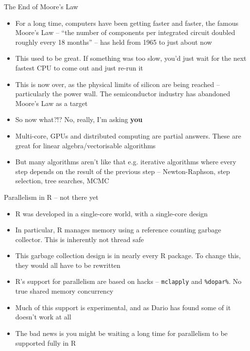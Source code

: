 \documentclass{beamer}
\begin{document}
\begin{frame}{The End of Moore's Law}
\begin{itemize}
\item For a long time, computers have been getting faster and faster, the famous
			Moore's Law -- ``the number of components per integrated circuit doubled roughly every 18 months'' -- 
			has held from 1965 to just about now
\item This used to be great. If something was too slow, you'd just wait for the next fastest CPU to come out
			and just re-run it
\item This is now over, as the physical limits of silicon are being reached -- particularly the power wall. 
			The semiconductor industry has abandoned Moore's Law as a target
\item So now what?!? No, really, I'm asking \textbf{you}
\item Multi-core, GPUs and distributed computing are partial answers. These are great for
			linear algebra/vectorisable algorithms
\item But many algorithms aren't like that e.g. iterative algorithms where every step depends on the 
			result of the previous step -- Newton-Raphson, step selection, tree searches, MCMC
\end{itemize}
\end{frame}

\begin{frame}{Parallelism in R -- not there yet}
\begin{itemize}
\item R was developed in a single-core world, with a single-core design
\item In particular, R manages memory using a reference counting garbage collector. This is inherently
			not thread safe
\item This garbage collection design is in nearly every R package. To change this, they would all have to
			be rewritten
\item R's support for parallelism are based on hacks -- \texttt{mclapply} and \texttt{\%dopar\%}. No true 
			shared memory concurrency
\item Much of this	support is experimental, and as Dario has found some of it doesn't work at all
\item The bad news is you might be waiting a long time for parallelism to be supported fully in R
\end{itemize}
\end{frame}
\end{document}
